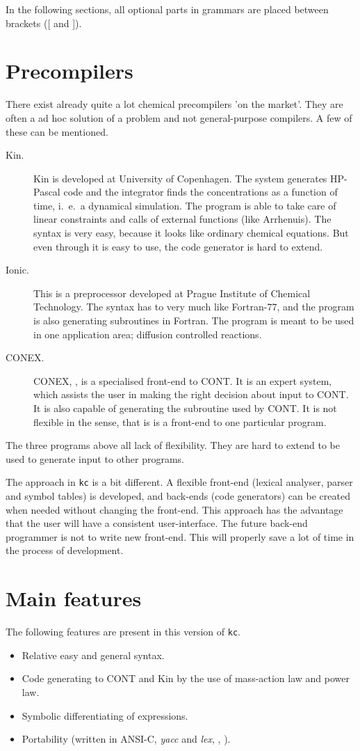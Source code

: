 In the following sections, all optional parts in grammars are placed between brackets ([ and ]).

\section{Precompilers}
There exist already quite a lot chemical precompilers 'on the market'. They are often a ad hoc solution
of a problem and not general-purpose compilers. A few of these can be mentioned.
\begin{description}
  \item[Kin.] Kin is developed at University of Copenhagen. The system generates HP-Pascal code and the 
       integrator finds the concentrations as a function of time, i.~e.~a dynamical simulation. The 
       program is able to take care of linear constraints and calls of external functions (like Arrhenuis).
       The syntax is very easy, because it looks like ordinary chemical equations. But even through it is easy
       to use, the code generator is hard to extend.
  \item[Ionic.] This is a preprocessor developed at Prague Institute of Chemical Technology. The syntax has
       to very much like Fortran-77, and the program is also generating subroutines in Fortran. The program 
       is meant to be used in one application area; diffusion controlled reactions.
  \item[CONEX.] CONEX, \cite{conex}, is a specialised front-end to CONT. It is an expert system, which assists the user in 
       making the right decision about input to CONT. It is also capable of generating the subroutine used
       by CONT. It is not flexible in the sense, that is is a front-end to one particular program.
\end{description}

The three programs above all lack of flexibility. They are hard to extend to be used to generate input to 
other programs. 

The approach in {\tt kc} is a bit different. A flexible front-end (lexical analyser, parser and symbol tables)
is developed, and back-ends (code generators) can be created when needed without changing the front-end. 
This approach has the advantage that the user will have a consistent user-interface. The future back-end
programmer is not to write new front-end. This will properly save a lot of time in the process of 
development. 

\section{Main features}
The following features are present in this version of {\tt kc}. 
\begin{itemize}
  \item Relative easy and general syntax.
  \item Code generating to CONT and Kin by the use of mass-action law and power law.
  \item Symbolic differentiating of expressions.
  \item Portability (written in ANSI-C, {\em yacc} and {\em lex}, \cite{ctools}, \cite{KR}).
\end{itemize}

